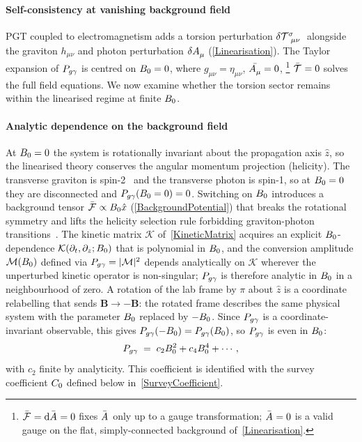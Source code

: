 \paragraph*{Self-consistency at vanishing background field}

PGT coupled to electromagnetism adds a torsion perturbation
$\delta\MAGT{^\sigma_\mu_\nu}$ alongside the graviton $h_{\mu\nu}$
and photon perturbation $\delta\FieldA{_\mu}$ (\cref{Linearisation}).
The Taylor expansion of $P_{g\gamma}$ is centred on $B_0=0$,
where $g_{\mu\nu}=\eta_{\mu\nu}$,
$\bar{\FieldA{_\mu}}=0$,%
\footnote{$\bar{\FieldF{}}=\diff\bar{\FieldA{}}=0$ fixes
$\bar{\FieldA{}}$ only up to a gauge transformation;
$\bar{\FieldA{}}=0$ is a valid gauge on the flat, simply-connected
background of~\cref{Linearisation}.}
$\bar{\MAGT{}}=0$ solves the full field equations.
We now examine whether the torsion sector remains within
the linearised regime at finite $B_0$.

\paragraph*{Analytic dependence on the background field}

At $B_0=0$ the system is rotationally invariant about the
propagation axis $\hat{z}$, so the linearised theory conserves the
angular momentum projection (helicity).
The transverse graviton is
spin-2~\cite{sezgin1980ghostfree,barker2024poincare,cillis1996graviton}
and the transverse photon is spin-1, so at $B_0=0$ they are
disconnected and $P_{g\gamma}(B_0=0)=0$.
Switching on $B_0$ introduces a background tensor
$\bar{\FieldF{}}\propto\Bzero\hat{x}$ (\cref{BackgroundPotential}) that breaks the rotational symmetry
and lifts the helicity selection rule
forbidding graviton-photon transitions~\cite{raffelt1988mixing}.
The kinetic matrix $\mathcal{K}$ of~\cref{KineticMatrix} acquires an
explicit $B_0$-dependence
$\mathcal{K}(\partial_t,\partial_z;B_0)$ that is polynomial in
$B_0$, and the conversion amplitude
$\mathcal{M}(B_0)$ defined via $P_{g\gamma}=|\mathcal{M}|^2$ depends
analytically on $\mathcal{K}$ wherever the unperturbed kinetic
operator is non-singular;
$P_{g\gamma}$ is therefore analytic in $B_0$ in a neighbourhood of
zero.
A rotation of the lab frame by $\pi$ about $\hat{z}$ is a coordinate
relabelling that sends $\bm{B}\to-\bm{B}$: the rotated frame describes
the same physical system with the parameter $B_0$ replaced by
$-B_0$.
Since $P_{g\gamma}$ is a coordinate-invariant observable, this gives
$P_{g\gamma}(-B_0)=P_{g\gamma}(B_0)$, so $P_{g\gamma}$ is even in $B_0$:
\begin{align}
  P_{g\gamma} \;=\; c_2B_0^2 + c_4B_0^4 + \cdots ,
  \label{TaylorPconv}
\end{align}
with $c_2$ finite by analyticity.
This coefficient is identified with the survey coefficient $C_0$
defined below in~\cref{SurveyCoefficient}.

